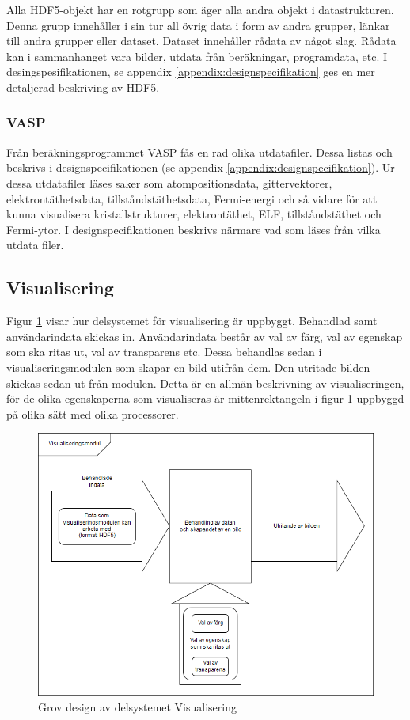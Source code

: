 \documentclass[a4paper,12pt]{article}
\begin{document}
Alla HDF5-objekt har en rotgrupp som äger alla andra objekt i datastrukturen. Denna grupp innehåller i sin tur all övrig data i form av andra grupper, länkar till andra grupper eller dataset.
Dataset innehåller rådata av något slag. Rådata kan i sammanhanget vara bilder, utdata från beräkningar, programdata, etc. %
I desingspesifikationen, se appendix \ref{appendix:designspecifikation} ges en mer detaljerad beskriving av HDF5.

\subsubsection{VASP}
Från beräkningsprogrammet VASP fås en rad olika utdatafiler. Dessa listas och beskrivs i designspecifikationen 
(se appendix \ref{appendix:designspecifikation}). Ur dessa utdatafiler läses saker som atompositionsdata, gittervektorer, elektrontäthetsdata, tillståndstäthetsdata, Fermi-energi och så vidare för att kunna visualisera kristallstrukturer, elektrontäthet, ELF, tillståndstäthet och Fermi-ytor. I designspecifikationen beskrivs närmare vad som läses från vilka utdata filer. 

\subsection{Visualisering}
\label{ch:visualisering}
Figur \ref{fig:visualisering} visar hur delsystemet för visualisering är uppbyggt. Behandlad samt användarindata skickas in. Användarindata består av val av färg, val av egenskap som ska ritas ut, val av transparens etc. Dessa behandlas sedan i visualiseringsmodulen som skapar en bild utifrån dem. Den utritade bilden skickas sedan ut från modulen. Detta är en allmän beskrivning av visualiseringen, för de olika egenskaperna som visualiseras är mittenrektangeln i figur \ref{fig:visualisering} uppbyggd på olika sätt med olika processorer.
\label{visualisering}
\begin{figure}[H]
	\centering
	\includegraphics[scale=0.55]{Visualisering.png}
	\caption{Grov design av delsystemet Visualisering}
	\label{fig:visualisering}
\end{figure}
\end{document}
